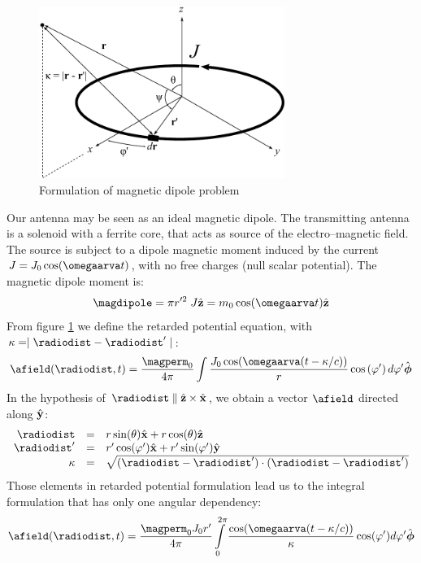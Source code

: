 \begin{figure}[h]
	\centering
	\includegraphics[width=8cm]{ch2/img/dipolo_magnetico.pdf}
	\caption{Formulation of magnetic dipole problem}
	\label{eq:dipolomagnetico}
	\forceversofloat
\end{figure}
Our antenna may be seen as an ideal magnetic dipole. The transmitting antenna is a solenoid with a ferrite core, that acts as source of the electro--magnetic field. The source is subject to a dipole magnetic moment induced by the current $J = J_0 \cos(\omegaarva t)$, with no free charges (null scalar potential). The magnetic dipole moment is:
\begin{equation}
\magdipole = \pi r'^2\; J \vrz = m_0 \cos(\omegaarva t) \vrz
\label{eq:dipolodacorrente}
\end{equation}
From figure \ref{eq:dipolomagnetico} we define the retarded potential equation, with ${\kappa = \mid \radiodist-\radiodist'\mid}$:
\[
\afield(\radiodist,t) = \dfrac{\magperm_0}{4\pi}\int{\dfrac{J_0\cos(\omegaarva (t - \kappa/c))}{r}\ccos{\varphi'}d\varphi'}\hat{\boldsymbol{\phi}}
\]
In the hypothesis of ${\radiodist\parallel\vrz\times\vrx}$, we obtain a vector $\afield$ directed along $\hat{\mathbf{y}}$:
\[\begin{array}{rcl}
\radiodist & = & r \sin(\theta) \vrx + r \cos(\theta) \vrz \\
\radiodist' & = & r' \cos(\varphi') \vrx + r' \sin(\varphi') \vry \\
\kappa & = & \sqrt{(\radiodist - \radiodist')\cdot(\radiodist - \radiodist')}
\end{array}\]
Those elements in retarded potential formulation lead us to the integral formulation that has only one angular dependency:
\begin{equation}
\label{eq:integraledacalc}
\afield(\radiodist,t) = \dfrac{\magperm_0 J_0 r'}{4\pi}\int\limits_{0}^{2\pi}{\dfrac{\cos(\omegaarva (t - \kappa/c))}{\kappa} \cos(\varphi') d\varphi' \hat{\boldsymbol{\phi}}}
\end{equation}
